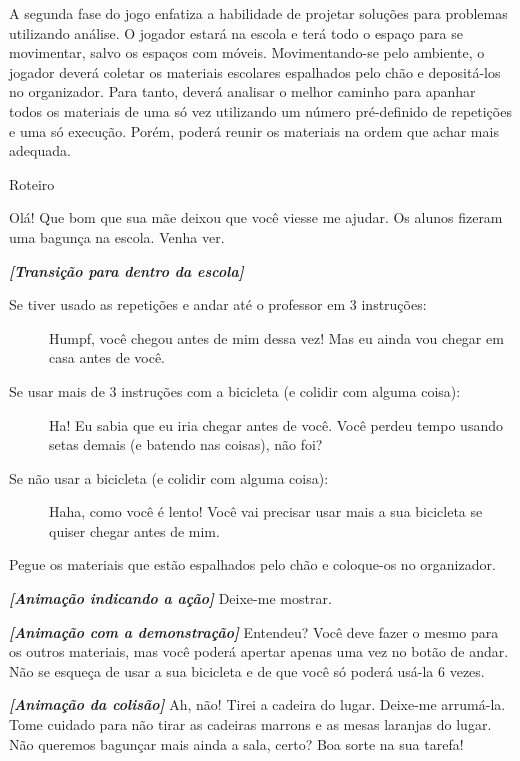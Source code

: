 A segunda fase do jogo enfatiza a habilidade de projetar soluções para problemas utilizando análise. O jogador estará na escola e terá todo o espaço para se movimentar, salvo os espaços com móveis. Movimentando-se pelo ambiente, o jogador deverá coletar os materiais escolares espalhados pelo chão e depositá-los no organizador. Para tanto, deverá analisar o melhor caminho para apanhar todos os materiais de uma só vez utilizando um número pré-definido de repetições e uma só execução. Porém, poderá reunir os materiais na ordem que achar mais adequada.

\begin{description}
	\item Roteiro
    \begin{description}
    	\item[Professor:] Olá! Que bom que sua mãe deixou que você viesse me ajudar. Os alunos fizeram uma bagunça na escola. Venha ver.
        \item \textbf{\textit{[Transição para dentro da escola]}}
        \item[Irmão:] 
        \begin{description}
            \item[]
            \item[Se tiver usado as repetições e andar até o professor em 3 instruções:] Humpf, você chegou antes de mim dessa vez! Mas eu ainda vou chegar em casa antes de você.
    		\item[Se usar mais de 3 instruções com a bicicleta (e colidir com alguma coisa):] Ha! Eu sabia que eu iria chegar antes de você. Você perdeu tempo usando setas demais (e batendo nas coisas), não foi?
    		\item[Se não usar a bicicleta (e colidir com alguma coisa):] Haha, como você é lento! Você vai precisar usar mais a sua bicicleta se quiser chegar antes de mim.
        \end{description}
        \item[Professor:] Pegue os materiais que estão espalhados pelo chão e coloque-os no organizador.
        \item[Professor:] \textbf{\textit{[Animação indicando a ação]}} Deixe-me mostrar.
        \item[Professor:] \textit{\textbf{[Animação com a demonstração]}} Entendeu? Você deve fazer o mesmo para os outros materiais, mas você poderá apertar apenas uma vez no botão de andar. Não se esqueça de usar a sua bicicleta e de que você só poderá usá-la 6 vezes.
        \item[Professor:] \textit{\textbf{[Animação da colisão]}} Ah, não! Tirei a cadeira do lugar. Deixe-me arrumá-la. Tome cuidado para não tirar as cadeiras marrons e as mesas laranjas do lugar. Não queremos bagunçar mais ainda a sala, certo? Boa sorte na sua tarefa!

\end{description}
\end{description}
